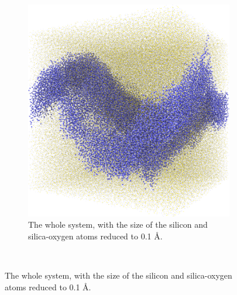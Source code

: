 \begin{figure}[!p]
{\begin{subfigure}[t]{\myfigwidth}
            \includegraphics[width=\textwidth]{images/systems/trimmed-rough_fracture05_04}%
            \caption{The whole system, with the size of the silicon and silica-oxygen atoms reduced to 0.1 \AA.}%
        \end{subfigure}%
    }%
    \vspace{10pt}\\%
\end{figure}
